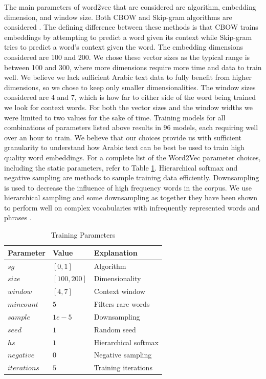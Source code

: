 The main parameters of word2vec that are considered are algorithm, embedding dimension, and window size. Both CBOW and Skip-gram algorithms are considered \cite{mikoloveffic:2013}. The defining difference between these methods is that CBOW trains embeddings by attempting to predict a word given its context while Skip-gram tries to predict a word's context given the word. The embedding dimensions considered are 100 and 200. We chose these vector sizes as the typical range is between 100 and 300, where more dimensions require more time and data to train well. We believe we lack sufficient Arabic text data to fully benefit from higher dimensions, so we chose to keep only smaller dimensionalities. The window sizes considered are 4 and 7, which is how far to either side of the word being trained we look for context words. For both the vector sizes and the window widths we were limited to two values for the sake of time. Training models for all combinations of parameters listed above results in 96 models, each requiring well over an hour to train. We believe that our choices provide us with sufficient granularity to understand how Arabic text can be best be used to train high quality word embeddings. For a complete list of the Word2Vec parameter choices, including the static parameters, refer to Table \ref{table:params}. Hierarchical softmax and negative sampling are methods to sample training data efficiently. Downsampling is used to decrease the influence of high frequency words in the corpus. We use hierarchical sampling and some downsampling as together they have been shown to perform well on complex vocabularies with infrequently represented words and phrases \cite{mikolovdist:2013}.

\begin{table}
\begin{center}

\begin{tabular}{l|l|l}
\textbf{Parameter} & \textbf{Value} & \textbf{Explanation} \\
\hline
$sg$ & $[0,1]$ & Algorithm \\
$size$ & $[100, 200]$ & Dimensionality \\
$window$ & $[4, 7]$ & Context window \\
$min count$ & $5$ & Filters rare words \\
$sample$ & $1e-5$ & Downsampling \\
$seed$ & $1$ & Random seed \\
$hs$ & $1$ & Hierarchical softmax \\
$negative$ & $0$ & Negative sampling \\
$iterations$ & $5$ & Training iterations \\
\end{tabular}
\caption{Training Parameters}
\label{table:params}
\end{center}
\end{table}
